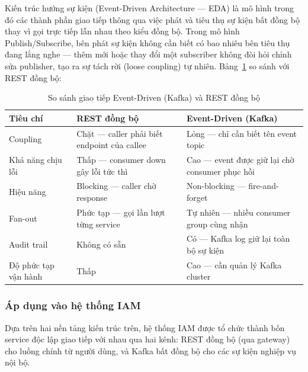 \documentclass[../DoAn.tex]{subfiles}
\begin{document}
Kiến trúc hướng sự kiện (Event-Driven Architecture — EDA) là mô hình trong đó các thành phần giao tiếp thông qua việc phát và tiêu thụ sự kiện bất đồng bộ thay vì gọi trực tiếp lẫn nhau theo kiểu đồng bộ. Trong mô hình Publish/Subscribe, bên phát sự kiện không cần biết có bao nhiêu bên tiêu thụ đang lắng nghe — thêm mới hoặc thay đổi một subscriber không đòi hỏi chỉnh sửa publisher, tạo ra sự tách rời (loose coupling) tự nhiên. Bảng~\ref{tab:eda-vs-rest} so sánh với REST đồng bộ:

\begin{table}[H]
\centering
\caption{So sánh giao tiếp Event-Driven (Kafka) và REST đồng bộ}
\label{tab:eda-vs-rest}
\begin{tabular}{|p{3.5cm}|p{5cm}|p{5cm}|}
\hline
\textbf{Tiêu chí} & \textbf{REST đồng bộ} & \textbf{Event-Driven (Kafka)} \\
\hline
Coupling & Chặt — caller phải biết endpoint của callee & Lỏng — chỉ cần biết tên event topic \\
\hline
Khả năng chịu lỗi & Thấp — consumer down gây lỗi tức thì & Cao — event được giữ lại chờ consumer phục hồi \\
\hline
Hiệu năng & Blocking — caller chờ response & Non-blocking — fire-and-forget \\
\hline
Fan-out & Phức tạp — gọi lần lượt từng service & Tự nhiên — nhiều consumer group cùng nhận \\
\hline
Audit trail & Không có sẵn & Có — Kafka log giữ lại toàn bộ sự kiện \\
\hline
Độ phức tạp vận hành & Thấp & Cao — cần quản lý Kafka cluster \\
\hline
\end{tabular}
\end{table}

\subsubsection{Áp dụng vào hệ thống IAM}

Dựa trên hai nền tảng kiến trúc trên, hệ thống IAM được tổ chức thành bốn service độc lập giao tiếp với nhau qua hai kênh: REST đồng bộ (qua gateway) cho luồng chính từ người dùng, và Kafka bất đồng bộ cho các sự kiện nghiệp vụ nội bộ.
\end{document}
